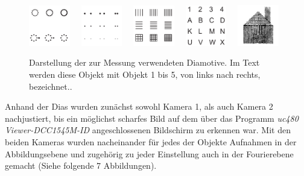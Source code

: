 \begin{figure}
	\centering
	\includegraphics[width=0.16\textwidth]{images/Anleitungsheft/objekt1.png}~~
	\includegraphics[width=0.16\textwidth]{images/Anleitungsheft/objekt2.png}~~
	\includegraphics[width=0.16\textwidth]{images/Anleitungsheft/objekt3.png}~~
	\includegraphics[width=0.16\textwidth]{images/Anleitungsheft/objekt4.png}~~
	\includegraphics[width=0.16\textwidth]{images/Anleitungsheft/objekt5.png}
	\caption[Die zur Messung verwendeten Diamotive]{
		Darstellung der zur Messung verwendeten Diamotive. Im Text werden diese Objekt mit Objekt 1 bis 5, von links nach rechts, bezeichnet..
	}
\label{fig:Objekte-aus-Anleitungsheft}
\end{figure}

Anhand der Dias wurden zunächst sowohl Kamera 1, als auch Kamera 2 nachjustiert, bis ein möglichst scharfes Bild auf dem über das Programm \textit{uc480 Viewer-DCC1545M-ID} angeschlossenen Bildschirm zu erkennen war. Mit den beiden Kameras wurden nacheinander für jedes der Objekte Aufnahmen in der Abbildungsebene und zugehörig zu jeder Einstellung auch in der Fourierebene gemacht (Siehe folgende 7 Abbildungen). 

